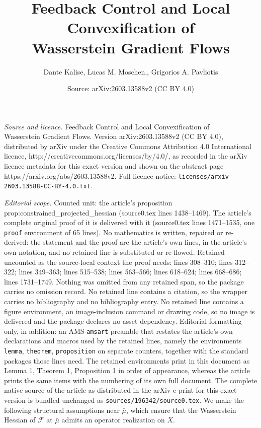 \documentclass[10pt,a4paper]{amsart}
\title{Feedback Control and Local Convexification of \\ Wasserstein Gradient Flows}
\author{Dante Kalise, Lucas M. Moschen,, Grigorios A. Pavliotis}
\date{Source: arXiv:2603.13588v2 (CC BY 4.0)}
\newcommand{\F}{\mathcal{F}}
\begin{document}
\maketitle

\noindent\emph{Source and licence.} Feedback Control and Local Convexification of \\ Wasserstein Gradient Flows. Version arXiv:2603.13588v2 (CC BY 4.0), distributed by arXiv under the Creative Commons Attribution 4.0 International licence, http://creativecommons.org/licenses/by/4.0/, as recorded in the arXiv licence metadata for this exact version and shown on the abstract page https://arxiv.org/abs/2603.13588v2. Full licence notice: \texttt{licenses/arxiv-2603.13588-CC-BY-4.0.txt}.\par\smallskip

\noindent\textit{Editorial scope.} Counted unit: the article's proposition prop:constrained\_projected\_hessian (source0.tex lines 1438--1469). The article's complete original proof of it is delivered with it (source0.tex lines 1471--1535, one \texttt{proof} environment of 65 lines). No mathematics is written, repaired or re-derived: the statement and the proof are the article's own lines, in the article's own notation, and no retained line is substituted or re-flowed.  Retained uncounted as the source-local context the proof needs: lines 308--310; lines 312--322; lines 349--363; lines 515--538; lines 563--566; lines 618--624; lines 668--686; lines 1731--1749.  Nothing was omitted from any retained span, so the package carries no omission record.  No retained line contains a citation, so the wrapper carries no bibliography and no bibliography entry.  No retained line contains a figure environment, an image-inclusion command or drawing code, so no image is delivered and the package declares no asset dependency.  Editorial formatting only, in addition: an AMS \texttt{amsart} preamble that restates the article's own declarations and macros used by the retained lines, namely the environments \texttt{lemma}, \texttt{theorem}, \texttt{proposition} on separate counters, together with the standard packages those lines need.  The retained environments print in this document as Lemma 1, Theorem 1, Proposition 1 in order of appearance, whereas the article prints the same items with the numbering of its own full document.  The complete native source of the article as distributed in the arXiv e-print for this exact version is bundled unchanged as \texttt{sources/196342/source0.tex}.
We make the following structural assumptions near $\bar\mu$, which ensure that the Wasserstein Hessian of $\F$ at $\bar\mu$ admits an operator realization on $X$.
\end{document}
